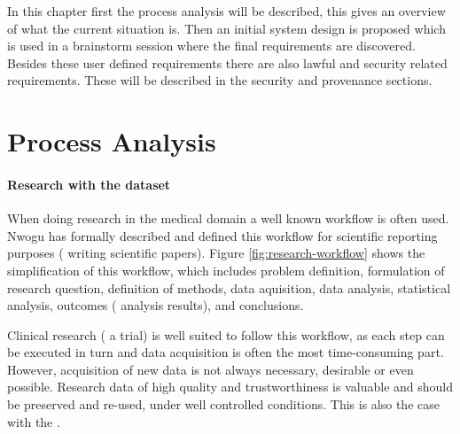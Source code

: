 
In this chapter first the process analysis will be described, this gives an overview of what the current situation is.
Then an initial system design is proposed which is used in a brainstorm session where the final requirements are discovered.
Besides these user defined requirements there are also lawful and security related requirements.
These will be described in the security and provenance sections.

\section{Process Analysis}
\label{process-analysis}

\paragraph{Research with the \project{} dataset}
When doing research in the medical domain a well known workflow is often used. Nwogu \cite{nwogu} has formally described and defined this workflow for scientific reporting purposes (\ie{} writing scientific papers).
Figure \ref{fig:research-workflow} shows the simplification of this workflow, which includes problem definition, formulation of research question, definition of methods, data aquisition, data analysis, statistical analysis, outcomes (\ie{} analysis results), and conclusions.

Clinical research (\eg{} a trial) is well suited to follow this workflow, as each step can be executed in turn and data acquisition is often the most time-consuming part.
However, acquisition of new data is not always necessary,  desirable or even possible. 
Research data of high quality and trustworthiness is valuable and should be preserved and re-used, under well controlled conditions. 
This is also the case with the \projectdata{}.

